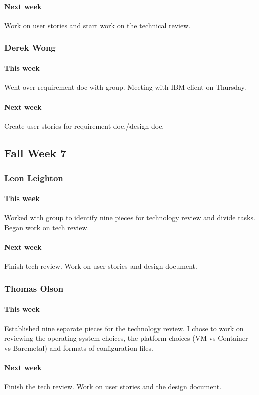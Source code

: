 \documentclass[10pt,letterpaper,onecolumn,draftclsnofoot]{IEEEtran}
\begin{document}
\paragraph{Next week}Work on user stories and start work on the technical review.
\subsubsection{Derek Wong}
\paragraph{This week}Went over requirement doc with group. Meeting with IBM client on Thursday.
\paragraph{Next week}Create user stories for requirement doc./design doc.

\subsection{Fall Week 7}
\subsubsection{Leon Leighton}
\paragraph{This week}Worked with group to identify nine pieces for technology review and divide tasks. Began work on tech review.
\paragraph{Next week}Finish tech review. Work on user stories and design document.

\subsubsection{Thomas Olson}
\paragraph{This week}Established nine separate pieces for the technology review. 
I chose to work on reviewing the operating system choices, the platform choices (VM vs Container vs Baremetal) 
and formats of configuration files.
\paragraph{Next week}Finish the tech review. Work on user stories and the design document.
\end{document}
